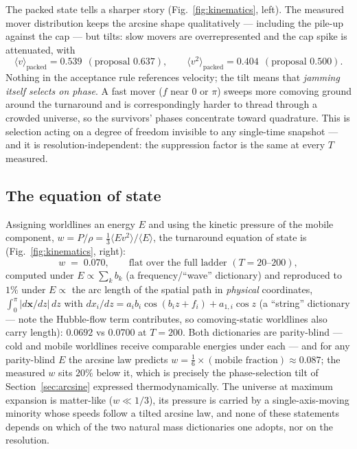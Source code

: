 \documentclass[11pt]{article}
\begin{document}
The packed state tells a sharper story (Fig.~\ref{fig:kinematics}, left).
The measured mover distribution keeps the arcsine shape qualitatively ---
including the pile-up against the cap --- but tilts: slow movers are
overrepresented and the cap spike is attenuated, with
\begin{equation*}
  \langle v \rangle_{\text{packed}} = 0.539 \ \ (\text{proposal } 0.637),
  \qquad
  \langle v^2 \rangle_{\text{packed}} = 0.404 \ \ (\text{proposal } 0.500).
\end{equation*}
Nothing in the acceptance rule references velocity; the tilt means that
\emph{jamming itself selects on phase}. A fast mover ($f$ near $0$ or
$\pi$) sweeps more comoving ground around the turnaround and is
correspondingly harder to thread through a crowded universe, so the
survivors' phases concentrate toward quadrature. This is selection acting on
a degree of freedom invisible to any single-time snapshot --- and it is
resolution-independent: the suppression factor is the same at every $T$
measured.

\subsection{The equation of state}
\label{sec:eos}

Assigning worldlines an energy $E$ and using the kinetic pressure of the
mobile component, $w = P/\rho = \tfrac13 \langle E v^2\rangle / \langle E
\rangle$, the turnaround equation of state is (Fig.~\ref{fig:kinematics},
right):
\begin{equation*}
  w \;=\; 0.070, \qquad \text{flat over the full ladder } (T = 20\text{--}200),
\end{equation*}
computed under $E \propto \sum_k b_k$ (a frequency/``wave'' dictionary) and
reproduced to $1\%$ under $E \propto$ the arc length of the spatial path in
\emph{physical} coordinates, $\int_0^\pi |d\mathbf{x}/dz|\,dz$ with
$dx_i/dz = a_i b_i \cos(b_i z + f_i) + a_{1,i}\cos z$ (a ``string''
dictionary --- note the Hubble-flow term contributes, so comoving-static
worldlines also carry length): $0.0692$ vs $0.0700$ at $T = 200$. Both
dictionaries are parity-blind --- cold and mobile worldlines receive
comparable energies under each --- and for any parity-blind $E$ the arcsine
law predicts
$w = \tfrac16 \times (\text{mobile fraction}) \approx 0.087$; the measured
$w$ sits $20\%$ below it, which is precisely the phase-selection tilt of
Section~\ref{sec:arcsine} expressed thermodynamically. The universe at
maximum expansion is matter-like ($w \ll 1/3$), its pressure is carried by a
single-axis-moving minority whose speeds follow a tilted arcsine law, and
none of these statements depends on which of the two natural mass
dictionaries one adopts, nor on the resolution.
\end{document}
